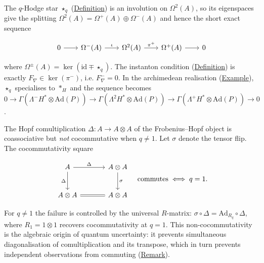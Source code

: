 \begin{remark}
  \label{rem:self-dual-ses}
The $q$-Hodge star $\star_q$ (\hyperref[def:q-hodge-star]{Definition}) is an
involution on $\Omega^2(A)$, so its eigenspaces give the splitting
$\Omega^2(A) = \Omega^+(A) \oplus \Omega^-(A)$ and hence
the short exact sequence

\begin{equation}\label{eq:self-dual-ses}
\begin{tikzcd}[column sep=2em]
  0 \ar[r]
  & \Omega^-(A)
    \ar[r, "\iota"]
  & \Omega^2(A)
    \ar[r, "\pi^+"]
  & \Omega^+(A)
    \ar[r]
  & 0
\end{tikzcd}
\end{equation}

where $\Omega^{\pm}(A) = \ker(\mathrm{id} \mp \star_q)$.
The instanton condition
(\hyperref[def:categorical-instanton]{Definition}) is exactly
$F_\nabla \in \ker(\pi^-)$, i.e. $F_\nabla^- = 0$.
In the archimedean realisation (\hyperref[prop:self-dual-curvature]{Example}),
$\star_q$ specialises to $*_H$ and the sequence becomes
$0 \to \Gamma(\Lambda^-\!H^* \otimes \mathrm{Ad}(P)) \to
\Gamma(\Lambda^2 H^* \otimes \mathrm{Ad}(P)) \to
\Gamma(\Lambda^+\!H^* \otimes \mathrm{Ad}(P)) \to 0$.
\end{remark}

\begin{remark}
  \label{rem:hopf-non-cocommutativity}
The Hopf comultiplication $\Delta \colon A \to A \otimes A$ of the
Frobenius--Hopf object is coassociative but \emph{not} cocommutative
when $q \neq 1$.  Let $\sigma$ denote the tensor flip.  The
cocommutativity square

\begin{equation}\label{eq:non-cocommutativity}
\begin{tikzcd}[row sep=2.5em, column sep=3.5em]
  A
    \ar[r, "\Delta"]
    \ar[d, "\Delta"']
  & A \otimes A
    \ar[d, "\sigma"]
  \\
  A \otimes A
    \ar[r, equal]
  & A \otimes A
\end{tikzcd}
\quad\text{commutes}\;\Longleftrightarrow\;q = 1.
\end{equation}

For $q \neq 1$ the failure is controlled by the universal $R$-matrix:
$\sigma \circ \Delta = \mathrm{Ad}_{R_q} \circ \Delta$,
where $R_1 = 1 \otimes 1$ recovers cocommutativity at $q = 1$.
This non-cocommutativity is the algebraic origin of quantum
uncertainty: it prevents simultaneous diagonalisation of comultiplication
and its transpose, which in turn prevents independent observations from
commuting (\hyperref[rem:two-observer-parallelogram]{Remark}).
\end{remark}


